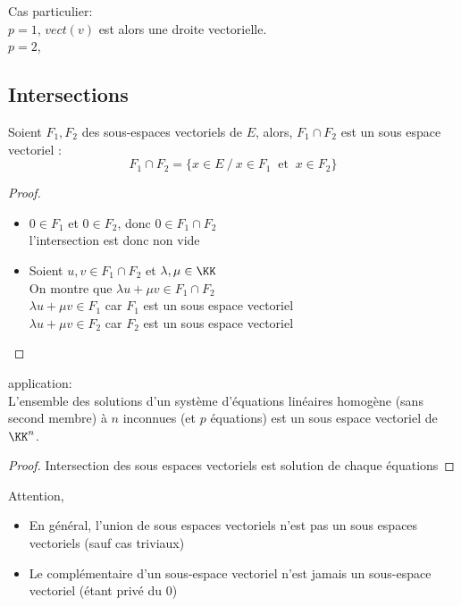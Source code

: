 \documentclass[../main.tex]{subfile}
\begin{document}
\begin{ex}
	Cas particulier:\\
	$p = 1$, $vect(v)$ est alors une droite vectorielle.\\
	$p=2$, %
\end{ex}

\subsection{Intersections}
\begin{prop}
	Soient $F_1, F_2$ des sous-espaces vectoriels de $E$, 
	alors, $F_1 \cap F_2$ est un sous espace vectoriel :
	$$F_1 \cap F_2 = \{x \in E \ / \ x \in F_1 \ \text{ et } \ x \in F_2\}$$
\end{prop}

\begin{proof}
\begin{itemize}	
	\item $0 \in F_1$ et $0 \in F_2$, donc $0 \in F_1 \cap F_2$\\
	l'intersection est donc non vide

	\item Soient $u, v \in F_1 \cap F_2$ et $\lambda, \mu \in \KK$\\
	On montre que $\lambda u + \mu v \in F_1 \cap F_2$\\
	$\lambda u + \mu v \in F_1$ car $F_1$ est un sous espace vectoriel\\
	$\lambda u + \mu v \in F_2$ car $F_2$ est un sous espace vectoriel\\
\end{itemize}
\end{proof}

application:\\
L'ensemble des solutions d'un système d'équations linéaires homogène (sans second membre) à $n$ inconnues (et $p$ équations) est un sous espace vectoriel de $\KK^n$.\\

\begin{proof}
	Intersection des sous espaces vectoriels est solution de chaque équations
\end{proof}

\begin{rema}
	Attention, \\
\begin{itemize}	
	\item En général, l'union de sous espaces vectoriels n'est pas un sous espaces vectoriels (sauf cas triviaux)
	\item Le complémentaire d'un sous-espace vectoriel n'est jamais un sous-espace vectoriel (étant privé du $0$)
\end{itemize}
\end{rema}
\end{document}
